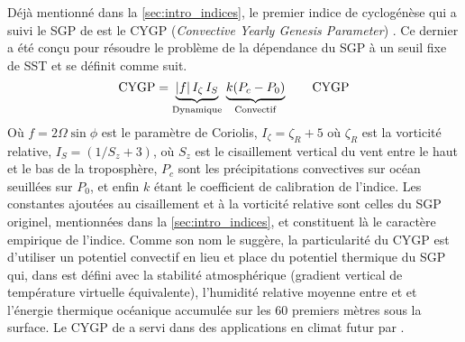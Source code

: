 \documentclass[../main.tex]{subfiles}
\begin{document}
Déjà mentionné dans la \cref{sec:intro_indices}, le premier indice de cyclogénèse qui a suivi le SGP de \citeauthor{gray_tropical_1975} est le CYGP
(\textit{Convective Yearly Genesis Parameter}) \parencite{royer_gcm_1998}. Ce dernier a été conçu pour résoudre le problème de la dépendance du SGP à un seuil
fixe de SST et se définit comme suit.
%
\begin{equation*} \mathrm{CYGP} = \underbrace{\lvert f \rvert \, I_\zeta \, I_S}_{\mathrm{Dynamique}} \, \underbrace{\vphantom{I_\zeta}k(P_c -
P_0)}_{\mathrm{Convectif}} \tag*{CYGP}
\end{equation*}
%
Où $f = 2 \Omega \sin \phi$ est le paramètre de Coriolis, $I_\zeta = \zeta_R \! +\! 5$ où $\zeta_R$ est la vorticité relative, $I_S = (1/S_z \! + \! 3)$, où
$S_z$ est le cisaillement vertical du vent entre le haut et le bas de la troposphère, $P_c$ sont les précipitations convectives sur océan seuillées sur $P_0$,
et enfin $k$ étant le coefficient de calibration de l'indice. Les constantes ajoutées au cisaillement et à la vorticité relative sont celles du SGP originel,
mentionnées dans la \cref{sec:intro_indices}, et constituent là le caractère empirique de l'indice. Comme son nom le suggère, la particularité
du CYGP est d'utiliser un potentiel convectif en lieu et place du potentiel thermique du SGP qui, dans \textcite{gray_tropical_1975} est défini avec la
stabilité atmosphérique (gradient vertical de température virtuelle équivalente), l'humidité relative moyenne entre  et  et l'énergie
thermique océanique accumulée sur les 60 premiers mètres sous la surface. Le CYGP de \citeauthor{royer_gcm_1998} a servi dans des applications en climat futur
par \textcite{mcdonald_tropical_2005,cattiaux_projected_2020,chauvin_response_2006,chauvin_future_2020}.
\end{document}
